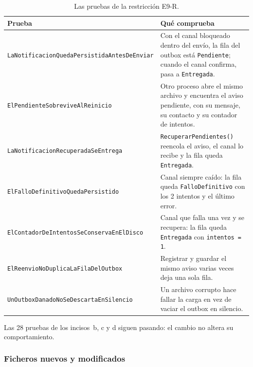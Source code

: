 \begin{table}[H]
\centering
\footnotesize
\begin{tabularx}{\textwidth}{>{\raggedright\arraybackslash}p{7.2cm} >{\raggedright\arraybackslash}X}
\toprule
\textbf{Prueba} & \textbf{Qué comprueba} \\
\midrule
\texttt{LaNotificacionQuedaPersistida\-AntesDeEnviar} & Con el canal bloqueado dentro del envío, la fila del outbox está \texttt{Pendiente}; cuando el canal confirma, pasa a \texttt{Entregada}. \\
\addlinespace
\texttt{ElPendienteSobreviveAlReinicio} & Otro proceso abre el mismo archivo y encuentra el aviso pendiente, con su mensaje, su contacto y su contador de intentos. \\
\addlinespace
\texttt{LaNotificacionRecuperadaSeEntrega} & \texttt{RecuperarPendientes()} reencola el aviso, el canal lo recibe y la fila queda \texttt{Entregada}. \\
\addlinespace
\texttt{ElFalloDefinitivoQuedaPersistido} & Canal siempre caído: la fila queda \texttt{FalloDefinitivo} con los 2 intentos y el último error. \\
\addlinespace
\texttt{ElContadorDeIntentosSeConserva\-EnElDisco} & Canal que falla una vez y se recupera: la fila queda \texttt{Entregada} con \texttt{intentos = 1}. \\
\addlinespace
\texttt{ElReenvioNoDuplicaLaFilaDelOutbox} & Registrar y guardar el mismo aviso varias veces deja una sola fila. \\
\addlinespace
\texttt{UnOutboxDanadoNoSeDescarta\-EnSilencio} & Un archivo corrupto hace fallar la carga en vez de vaciar el outbox en silencio. \\
\bottomrule
\end{tabularx}
\caption{Las pruebas de la restricción E9-R.}
\end{table}

Las 28 pruebas de los incisos~b, c y d siguen pasando: el cambio no altera su comportamiento.

\subsubsection{Ficheros nuevos y modificados}

